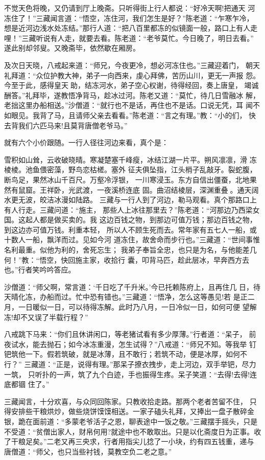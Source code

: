 不觉天色将晚，又仍请到厅上晚斋。只听得街上行人都说：“好冷天啊!把通天
河冻住了！”三藏闻言道：“悟空，冻住河，我们怎生是好？”陈老道：“乍寒乍冷，
想是近河边浅水处冻结。”那行人道：“把八百里都冻的似镜面一般，路口上有人走
哩！”三藏听说有人走，就要去看。陈老道：“老爷莫忙。今日晚了，明日去看。”
遂此别却邻叟。又晚斋毕，依然歇在厢房。

及次日天晓，八戒起来道：“师兄，今夜更冷，想必河冻住也。”三藏迎着门，
朝天礼拜道：“众位护教大神，弟子一向西来，虔心拜佛，苦历山川，更无一声报
怨。今至于此，感得皇天助，结冻河水，弟子空心权谢，待得经回，奏上唐皇，
竭诚酬答。”礼拜毕，遂教悟净背马，趁冰过河。陈老又道：“莫忙，待几日雪融冰
解，老拙这里办船相送。”沙僧道：“就行也不是话，再住也不是话。口说无凭，耳
闻不如眼见。我背了马，且请师父亲去看看。”陈老道：“言之有理。”教：“小的们，
快去背我们六匹马来!且莫背唐僧老爷马。”

就有六个小价跟随。一行人径往河边来看，真个是：

雪积如山耸，云收破晓晴。寒凝楚塞千峰瘦，冰结江湖一片平。朔风凛凛，滑
冻棱棱。池鱼偎密藻，野鸟恋枯槎。塞外
征夫俱坠指，江头梢子乱敲牙。裂蛇腹，断鸟足，果然冰山千百尺。万壑冷浮银，
一川寒浸玉。东方自信出僵蚕，北地果然有鼠窟。王祥卧，光武渡，一夜溪桥连底
固。曲沼结棱层，深渊重叠。通天阔水更无波，皎洁冰漫如陆路。
三藏与一行人到了河边，勒马观看。真个那路口上有人行走。三藏问道：“施主，
那些人上冰往那里去？”陈老道：“河那边乃西梁女国。这起人都是做买卖的。我
这边百钱之物，到那边可值万钱；那边百钱之物，到这边亦可值万钱。利重本轻，
所以人不顾生死而去。常年家有五七人一船，或十数人一船，飘洋而过。见如今河
道冻住，故舍命而步行也。”三藏道：“世间事惟名利最重。似他为利的，舍死忘生；
我弟子奉旨全忠，也只是为名，与他能差几何！”教：“悟空，快回施主家，收拾行
囊，叩背马匹，趁此层冰，早奔西方去也。”行者笑吟吟答应。

沙僧道：“师父啊，常言道：‘千日吃了千升米。’今已托赖陈府上，且再住几
日，待天晴化冻，办船而过。忙中恐有错也。”三藏道：“悟净，怎么这等愚见!若
是正二月，一日暖似一日，可以待得冻解。此时乃八月，一日冷似一日，如何可便
望解冻!却不又误了半载行程？”

八戒跳下马来：“你们且休讲闲口，等老猪试看有多少厚薄。”行者道：“呆子，
前夜试水，能去抛石；如今冰冻重漫，怎生试得？”八戒道：“师兄不知。等我举
钉钯筑他一下。假若筑破，就是冰薄，且不敢行；若筑不动，便是冰厚，如何不行？”
三藏道：“正是，说得有理。”那呆子撩衣拽步，走上河边，双手举钯，尽力一筑，
只听扑的一声，筑了九个白迹，手也振得生疼。呆子笑道：“去得!去得!连底都锢
住了。”

三藏闻言，十分欢喜，与众同回陈家。只教收拾走路。那两个老者苦留不住，
只得安排些干粮烘炒，做些烧饼馍馍相送。一家子磕头礼拜，又捧出一盘子散碎金
银，跪在面前道：“多蒙老爷活子之恩，聊表途中一饭之敬。”三藏摆手摇头，只是
不受道：“贫僧出家人，财帛何用?就途中也不敢取出。只是以化斋度日为正事。收
了干粮足矣。”二老又再三央求，行者用指尖儿捻了一小块，约有四五钱重，递与
唐僧道：“师父，也只当些衬钱，莫教空负二老之意。”

